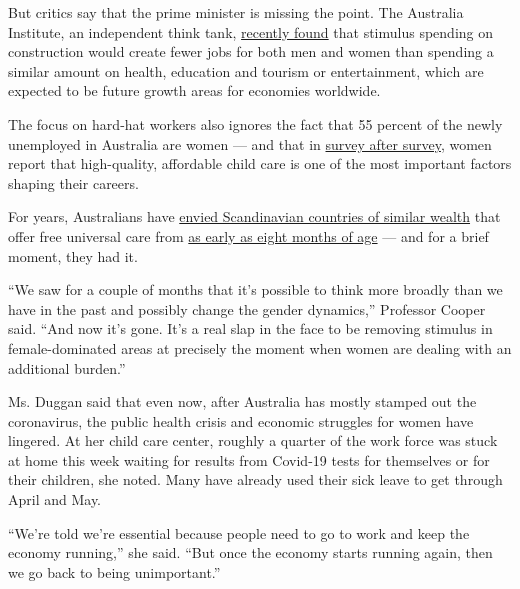 But critics say that the prime minister is missing the point. The
Australia Institute, an independent think tank,
\href{https://www.tai.org.au/content/new-analysis-more-women-unemployed-yet-stimulus-favours-male-dominated-industries}{recently
found} that stimulus spending on construction would create fewer jobs
for both men and women than spending a similar amount on health,
education and tourism or entertainment, which are expected to be future
growth areas for economies worldwide.

The focus on hard-hat workers also ignores the fact that 55 percent of
the newly unemployed in Australia are women --- and that in
\href{https://www.abc.net.au/news/2019-07-30/working-mothers-more-stressed-than-fathers-report-finds/11365632}{survey
after survey}, women report that high-quality, affordable child care is
one of the most important factors shaping their careers.

For years, Australians have
\href{https://www.smh.com.au/education/looking-to-swedish-model-of-childcare-and-education-20150518-gh48hj.html}{envied
Scandinavian countries of similar wealth} that offer free universal care
from
\href{https://www.weforum.org/agenda/2019/03/nordic-nations-best-places-for-parents-children/\#:~:text=Finland\%20provides\%20free\%20universal\%20daycare,formal\%20education\%20at\%20age\%20seven.\&text=In\%20Sweden\%2C\%20parents\%20are\%20entitled,at\%2080\%25\%20of\%20their\%20salary}{as
early as eight months of age} --- and for a brief moment, they had it.

``We saw for a couple of months that it's possible to think more broadly
than we have in the past and possibly change the gender dynamics,''
Professor Cooper said. ``And now it's gone. It's a real slap in the face
to be removing stimulus in female-dominated areas at precisely the
moment when women are dealing with an additional burden.''

Ms. Duggan said that even now, after Australia has mostly stamped out
the coronavirus, the public health crisis and economic struggles for
women have lingered. At her child care center, roughly a quarter of the
work force was stuck at home this week waiting for results from Covid-19
tests for themselves or for their children, she noted. Many have already
used their sick leave to get through April and May.

``We're told we're essential because people need to go to work and keep
the economy running,'' she said. ``But once the economy starts running
again, then we go back to being unimportant.''

